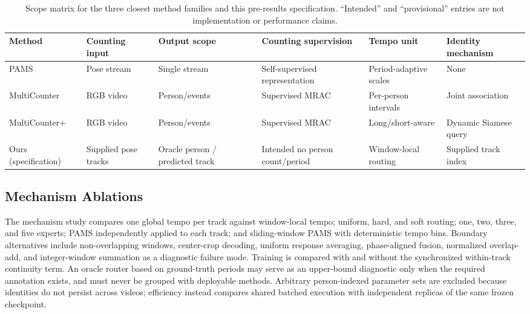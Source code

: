 \begin{table}[t]
  \centering
  \footnotesize
  \setlength{\tabcolsep}{2.5pt}
  \caption{Scope matrix for the three closest method families and this
  pre-results specification. ``Intended'' and ``provisional'' entries are not
  implementation or performance claims.}
  \label{tab:prior_scope}
  \begin{tabular}{p{}p{}p{}
    p{}p{}p{}}
    \toprule
    Method & Counting input & Output scope & Counting supervision & Tempo unit & Identity mechanism \\
    \midrule
    PAMS~\cite{gao2026pams} & Pose stream & Single stream & Self-supervised representation & Period-adaptive scales & None \\
    MultiCounter~\cite{tang2024multicounter} & RGB video & Person/events & Supervised MRAC & Per-person intervals & Joint association \\
    MultiCounter+~\cite{tang2026multicounterplus} & RGB video & Person/events & Supervised MRAC & Long/short-aware & Dynamic Siamese query \\
    Ours (specification) & Supplied pose tracks & Oracle person / predicted track & Intended no person count/period & Window-local routing & Supplied track index \\
    \bottomrule
  \end{tabular}
\end{table}

\subsection{Mechanism Ablations}

The mechanism study compares one global tempo per track against window-local
tempo; uniform, hard, and soft routing; one, two, three, and five experts;
PAMS independently applied to each track; and sliding-window PAMS with
deterministic tempo bins. Boundary alternatives include non-overlapping
windows, center-crop decoding, uniform response averaging, phase-aligned
fusion, normalized overlap-add, and integer-window summation as a diagnostic
failure mode. Training is compared with and without the synchronized
within-track continuity term. An oracle router based on ground-truth periods
may serve as an upper-bound diagnostic only when the required annotation
exists, and must never be grouped with deployable methods. Arbitrary
person-indexed parameter sets are excluded because identities do not persist
across videos; efficiency instead compares shared batched execution with
independent replicas of the same frozen checkpoint.


